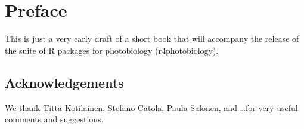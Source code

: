 \chapter{Preface}

This is just a very early draft of a short book that will accompany the release of the suite of R packages for photobiology (\textsf{r4photobiology}).

\section{Acknowledgements}

We thank Titta Kotilainen, Stefano Catola, Paula Salonen, and \ldots for very useful comments and suggestions.
